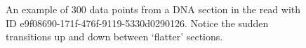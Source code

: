 \begin{figure}
\centering

\caption{\label{fig:dna300-section}An example of 300 data points from a DNA section in the read with ID e9f08690-171f-476f-9119-5330d0290126. Notice the sudden transitions up and down between `flatter' sections.}
\end{figure}

